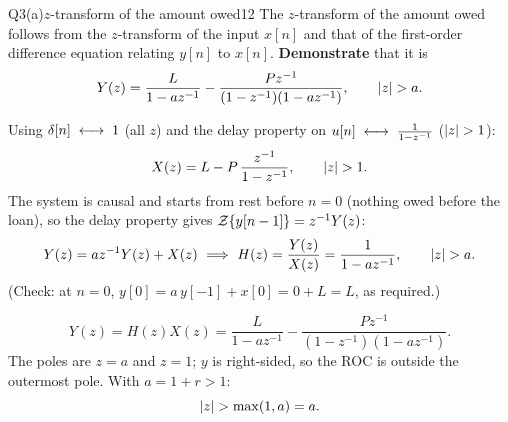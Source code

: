 \begin{qcard}{Q3(a)}{$z$-transform of the amount owed}{12}
The $z$-transform of the amount owed follows from the $z$-transform of the input $x[n]$ and that of the first-order difference equation relating $y[n]$ to $x[n]$. \textbf{Demonstrate} that it is
\[Y(z)=\frac{L}{1-az^{-1}}-\frac{Pz^{-1}}{(1-z^{-1})(1-az^{-1})},\qquad\lvert z\rvert>a .\]
\end{qcard}
\begin{solution}
 Using $\delta[n]\;\longleftrightarrow\;1$ (all $z$) and the delay property on $u[n]\;\longleftrightarrow\;\frac1{1-z^{-1}}$ ($\lvert z\rvert>1$):
\[X(z)=L-P\,\frac{z^{-1}}{1-z^{-1}},\qquad\lvert z\rvert>1 .\]
 The system is causal and starts from rest before $n=0$ (nothing owed before the loan), so the delay property gives $\mathcal{Z}\{y[n-1]\}=z^{-1}Y(z)$:
\[Y(z)=az^{-1}Y(z)+X(z)\ \Longrightarrow\ H(z)=\frac{Y(z)}{X(z)}=\frac{1}{1-az^{-1}},\qquad\abs z>a .\]
(Check: at $n=0$, $y[0]=a\,y[-1]+x[0]=0+L=L$, as required.)

\[Y(z)=H(z)X(z)=\frac{L}{1-az^{-1}}-\frac{Pz^{-1}}{(1-z^{-1})(1-az^{-1})}.\]
 The poles are $z=a$ and $z=1$; $y$ is right-sided, so the ROC is outside the outermost pole. With $a=1+r>1$:
\[\lvert z\rvert>\max(1,a)=a .\]
\end{solution}

